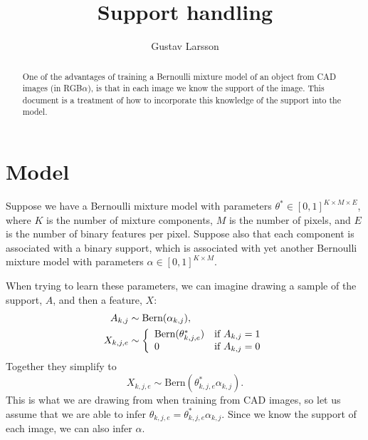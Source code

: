 \documentclass{article}
\newcommand{\Bern}[1]{\text{Bern}(#1)}
\begin{document}
\title{Support handling}

\author{Gustav Larsson}

\maketitle

\begin{abstract}
One of the advantages of training a Bernoulli mixture model of an object from CAD images (in RGB$\alpha$), is that in each image we know the support of the image. This document is a treatment of how to incorporate this knowledge of the support into the model.
%
%
\end{abstract}
%


\section{Model}
Suppose we have a Bernoulli mixture model with parameters $\theta^* \in [0, 1]^{K \times M \times E}$, where $K$ is the number of mixture components, $M$ is the number of pixels, and $E$ is the number of binary features per pixel. Suppose also that each component is associated with a binary support, which is associated with yet another Bernoulli mixture model with parameters $\alpha \in [0, 1]^{K \times M}$.

When trying to learn these parameters, we can imagine drawing a sample of the support, $A$, and then a feature, $X$:
\begin{align*}
    A_{k,j} & \sim \Bern{\alpha_{k,j}}, \\
    X_{k,j,e} & \sim \left\{
        \begin{array}{l l}
            \Bern{\theta^*_{k,j,e}} & \text{if }A_{k,j} = 1  \\
            0 & \text{if }A_{k,j} = 0
        \end{array} \right.
\end{align*}
Together they simplify to 
\[
    X_{k,j,e} \sim \Bern{\theta^*_{k,j,e} \alpha_{k,j}}.
\] 
This is what we are drawing from when training from CAD images, so let us assume that we are able to infer $\theta_{k,j,e} = \theta^*_{k,j,e} \alpha_{k,j}$. Since we know the support of each image, we can also infer $\alpha$.
\end{document}
